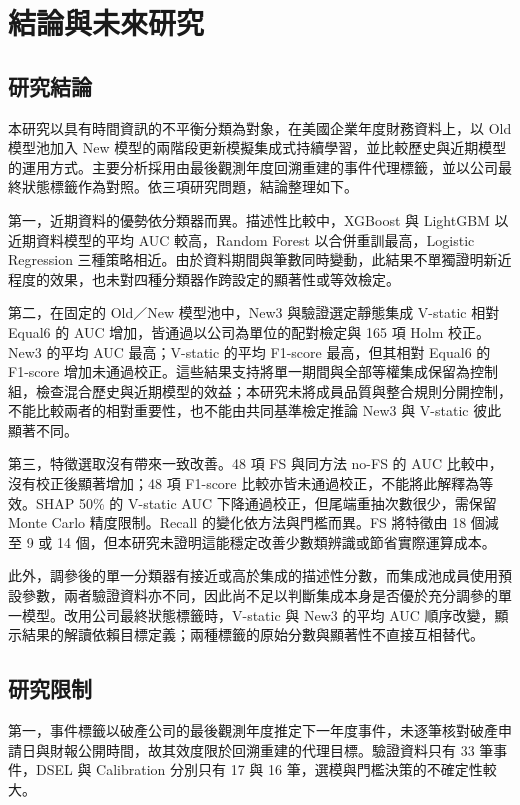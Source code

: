 \chapter{結論與未來研究}\label{chap:conclusion}
\begingroup
\setlength{\emergencystretch}{2em}

\section{研究結論}

本研究以具有時間資訊的不平衡分類為對象，在美國企業年度財務資料上，以 Old 模型池加入 New 模型的兩階段更新模擬集成式持續學習，並比較歷史與近期模型的運用方式。主要分析採用由最後觀測年度回溯重建的事件代理標籤，並以公司最終狀態標籤作為對照。依三項研究問題，結論整理如下。

第一，近期資料的優勢依分類器而異。描述性比較中，XGBoost 與 LightGBM 以近期資料模型的平均 AUC 較高，Random Forest 以合併重訓最高，Logistic Regression 三種策略相近。由於資料期間與筆數同時變動，此結果不單獨證明新近程度的效果，也未對四種分類器作跨設定的顯著性或等效檢定。

第二，在固定的 Old／New 模型池中，New3 與驗證選定靜態集成 V-static 相對 Equal6 的 AUC 增加，皆通過以公司為單位的配對檢定與 165 項 Holm 校正。New3 的平均 AUC 最高；V-static 的平均 F1-score 最高，但其相對 Equal6 的 F1-score 增加未通過校正。這些結果支持將單一期間與全部等權集成保留為控制組，檢查混合歷史與近期模型的效益；本研究未將成員品質與整合規則分開控制，不能比較兩者的相對重要性，也不能由共同基準檢定推論 New3 與 V-static 彼此顯著不同。

第三，特徵選取沒有帶來一致改善。48 項 FS 與同方法 no-FS 的 AUC 比較中，沒有校正後顯著增加；48 項 F1-score 比較亦皆未通過校正，不能將此解釋為等效。SHAP 50\% 的 V-static AUC 下降通過校正，但尾端重抽次數很少，需保留 Monte Carlo 精度限制。Recall 的變化依方法與門檻而異。FS 將特徵由 18 個減至 9 或 14 個，但本研究未證明這能穩定改善少數類辨識或節省實際運算成本。

此外，調參後的單一分類器有接近或高於集成的描述性分數，而集成池成員使用預設參數，兩者驗證資料亦不同，因此尚不足以判斷集成本身是否優於充分調參的單一模型。改用公司最終狀態標籤時，V-static 與 New3 的平均 AUC 順序改變，顯示結果的解讀依賴目標定義；兩種標籤的原始分數與顯著性不直接互相替代。

\section{研究限制}

第一，事件標籤以破產公司的最後觀測年度推定下一年度事件，未逐筆核對破產申請日與財報公開時間，故其效度限於回溯重建的代理目標。驗證資料只有 33 筆事件，DSEL 與 Calibration 分別只有 17 與 16 筆，選模與門檻決策的不確定性較大。

